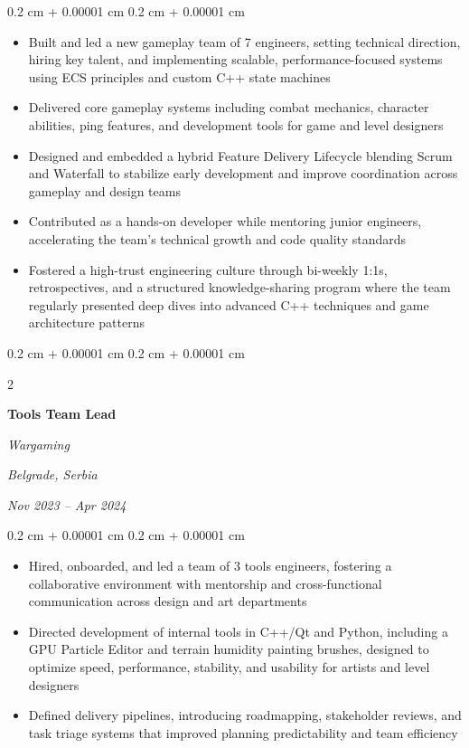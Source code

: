 \documentclass[10pt, letterpaper]{article}
\newenvironment{highlights}{
    \begin{itemize}[
        topsep=0.10 cm,
        parsep=0.10 cm,
        partopsep=0pt,
        itemsep=0pt,
        leftmargin=0.4 cm + 10pt
    ]
}{
    \end{itemize}
} %
\newenvironment{onecolentry}{
    \begin{adjustwidth}{
        0.2 cm + 0.00001 cm
    }{
        0.2 cm + 0.00001 cm
    }
}{
    \end{adjustwidth}
} %
\newenvironment{twocolentry}[2][]{
    \onecolentry
    \def\secondColumn{#2}
    \setcolumnwidth{\fill, 4.5 cm}
    \begin{paracol}{2}
}{
    \switchcolumn \raggedleft \secondColumn
    \end{paracol}
    \endonecolentry
} %
\begin{document}
        \vspace{0.10 cm}
        \begin{onecolentry}
            \begin{highlights}
                \item Built and led a new gameplay team of 7 engineers, setting technical direction, hiring key talent, and implementing scalable, performance-focused systems using ECS principles and custom C++ state machines
                \item Delivered core gameplay systems including combat mechanics, character abilities, ping features, and development tools for game and level designers
                \item Designed and embedded a hybrid Feature Delivery Lifecycle blending Scrum and Waterfall to stabilize early development and improve coordination across gameplay and design teams
                \item Contributed as a hands-on developer while mentoring junior engineers, accelerating the team's technical growth and code quality standards
                \item Fostered a high-trust engineering culture through bi-weekly 1:1s, retrospectives, and a structured knowledge-sharing program where the team regularly presented deep dives into advanced C++ techniques and game architecture patterns
            \end{highlights}
        \end{onecolentry}


        \vspace{0.2 cm}

\begin{twocolentry}{
        \textit{Belgrade, Serbia}    
            
        \textit{Nov 2023 – Apr 2024}}
            \textbf{Tools Team Lead}
            
            \textit{Wargaming}
        \end{twocolentry}

        \vspace{0.10 cm}
        \begin{onecolentry}
            \begin{highlights}
                \item Hired, onboarded, and led a team of 3 tools engineers, fostering a collaborative environment with mentorship and cross-functional communication across design and art departments
                \item Directed development of internal tools in C++/Qt and Python, including a GPU Particle Editor and terrain humidity painting brushes, designed to optimize speed, performance, stability, and usability for artists and level designers
                \item Defined delivery pipelines, introducing roadmapping, stakeholder reviews, and task triage systems that improved planning predictability and team efficiency
            \end{highlights}
        \end{onecolentry}
\end{document}
